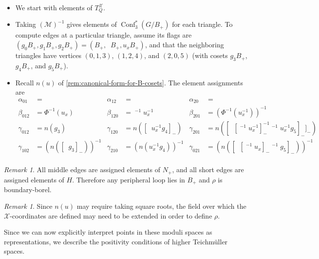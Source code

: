 \documentclass{amsart}
\theoremstyle{plain}
\theoremstyle{definition}
\theoremstyle{remark}
\newtheorem{remark}[theorem]{Remark}
\newcommand{\conftoquiv}{\mathcal{M}}
\newcommand{\lifttoG}[1]{{\mathop{\overline{#1}}}}
\newcommand{\seedXtorus}{T^{\mathcal{X}}}
\DeclareMathOperator{\Conf}{Conf}
\begin{document}
  \begin{itemize}
  \item
    We start with elements of $\seedXtorus_Q$.
  \item
    Taking $(\conftoquiv)^{-1}$ gives elements of
    $\Conf_3^{\ast}(G/B_{+})$ for each triangle. To compute edges at a
    particular triangle, assume its flags are $(g_0 B_{+}, g_1 B_{+},
    g_2 B_{+}) = (B_{+}, \lifttoG{w_0} B_{+}, u_x B_{+})$, and that the
    neighboring triangles have vertices $(0, 1, 3)$, $(1, 2, 4)$, and
    $(2, 0, 5)$ (with cosets $g_3 B_{+}$, $g_4 B_{+}$, and $g_5 B_{+}$).
  \item
    Recall $n(u)$ of \cref{rem:canonical-form-for-B-cosets}. The element
    assignments are
    \begin{align*}
      \alpha_{01} &= \lifttoG{w_0} & \alpha_{12} &= \lifttoG{w_0} & \alpha_{20} &= \lifttoG{w_0} \\
      \beta_{012} &= \Phi^{-1}(u_x) & \beta_{120} &= \lifttoG{w_0}^{-1} u_x^{-1} \lifttoG{w_0} & \beta_{201} &= \left( \Phi^{-1}(u_x^{-1}) \right)^{-1} \\
      \gamma_{012} &= n(g_3) & \gamma_{120} &= n([\lifttoG{w_0} u_x^{-1} g_4]_{-}) & \gamma_{201} &= n([\lifttoG{w_0} [\lifttoG{w_0}^{-1} u_x^{-1}]_{-}^{-1} \lifttoG{w_0}^{-1} u_x^{-1} g_5 ]_{-}]_{-}) \\
      \gamma_{102} &= \left( n([\lifttoG{w_0} g_3]_{-}) \right)^{-1} & \gamma_{210} &= \left( n(u_x^{-1} g_4) \right)^{-1} & \gamma_{021} &= \left( n([\lifttoG{w_0} [\lifttoG{w_0}^{-1} u_x]_{-} \lifttoG{w_0}^{-1} g_5 ]_{-}) \right)^{-1} \\
    \end{align*}
  \end{itemize}

  \begin{remark}
    All middle edges are assigned elements of $N_{+}$, and all short
    edges are assigned elements of $H$. Therefore any peripheral loop
    lies in $B_{+}$ and $\rho$ is boundary-borel.
  \end{remark}

  \begin{remark}
    Since $n(u)$ may require taking square roots, the field over which
    the $\mathcal{X}$-coordinates are defined may need to be extended in
    order to define $\rho$.
  \end{remark}

  Since we can now explicitly interpret points in these moduli spaces as
  representations, we describe the positivity conditions of higher
  Teichmüller spaces.
\end{document}
